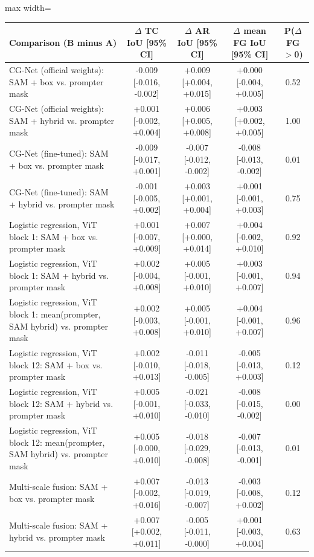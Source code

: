 \begin{table}[htbp]
\centering
\small
\begin{adjustbox}{max width=\linewidth}
\begin{tabular}{lcccc}
\toprule
Comparison (B minus A) & $\Delta$ TC IoU [95\% CI] & $\Delta$ AR IoU [95\% CI] & $\Delta$ mean FG IoU [95\% CI] & P($\Delta$FG$>$0) \\
\midrule
CG-Net (official weights): SAM + box vs. prompter mask & -0.009 [-0.016, -0.002] & +0.009 [+0.004, +0.015] & +0.000 [-0.004, +0.005] & 0.52 \\
CG-Net (official weights): SAM + hybrid vs. prompter mask & +0.001 [-0.002, +0.004] & +0.006 [+0.005, +0.008] & +0.003 [+0.002, +0.005] & 1.00 \\
CG-Net (fine-tuned): SAM + box vs. prompter mask & -0.009 [-0.017, +0.001] & -0.007 [-0.012, -0.002] & -0.008 [-0.013, -0.002] & 0.01 \\
CG-Net (fine-tuned): SAM + hybrid vs. prompter mask & -0.001 [-0.005, +0.002] & +0.003 [+0.001, +0.004] & +0.001 [-0.001, +0.003] & 0.75 \\
Logistic regression, ViT block 1: SAM + box vs. prompter mask & +0.001 [-0.007, +0.009] & +0.007 [+0.000, +0.014] & +0.004 [-0.002, +0.010] & 0.92 \\
Logistic regression, ViT block 1: SAM + hybrid vs. prompter mask & +0.002 [-0.004, +0.008] & +0.005 [-0.001, +0.010] & +0.003 [-0.001, +0.007] & 0.94 \\
Logistic regression, ViT block 1: mean(prompter, SAM hybrid) vs. prompter mask & +0.002 [-0.003, +0.008] & +0.005 [-0.001, +0.010] & +0.004 [-0.001, +0.007] & 0.96 \\
Logistic regression, ViT block 12: SAM + box vs. prompter mask & +0.002 [-0.010, +0.013] & -0.011 [-0.018, -0.005] & -0.005 [-0.013, +0.003] & 0.12 \\
Logistic regression, ViT block 12: SAM + hybrid vs. prompter mask & +0.005 [-0.001, +0.010] & -0.021 [-0.033, -0.010] & -0.008 [-0.015, -0.002] & 0.00 \\
Logistic regression, ViT block 12: mean(prompter, SAM hybrid) vs. prompter mask & +0.005 [-0.000, +0.010] & -0.018 [-0.029, -0.008] & -0.007 [-0.013, -0.001] & 0.01 \\
Multi-scale fusion: SAM + box vs. prompter mask & +0.007 [-0.002, +0.016] & -0.013 [-0.019, -0.007] & -0.003 [-0.008, +0.002] & 0.12 \\
Multi-scale fusion: SAM + hybrid vs. prompter mask & +0.007 [+0.002, +0.011] & -0.005 [-0.011, -0.000] & +0.001 [-0.003, +0.004] & 0.63 \\

\end{tabular}
\end{adjustbox}
\end{table}
